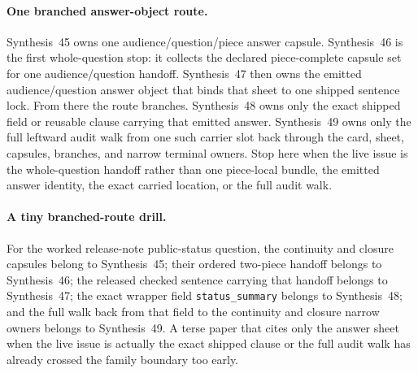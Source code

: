 \documentclass[11pt]{article}
\begin{document}
\paragraph{One branched answer-object route.}
Synthesis~45 owns one audience/question/piece answer capsule. Synthesis~46 is the first whole-question stop: it collects the declared piece-complete capsule set for one audience/question handoff. Synthesis~47 then owns the emitted audience/question answer object that binds that sheet to one shipped sentence lock. From there the route branches. Synthesis~48 owns only the exact shipped field or reusable clause carrying that emitted answer. Synthesis~49 owns only the full leftward audit walk from one such carrier slot back through the card, sheet, capsules, branches, and narrow terminal owners. Stop here when the live issue is the whole-question handoff rather than one piece-local bundle, the emitted answer identity, the exact carried location, or the full audit walk.

\paragraph{A tiny branched-route drill.}
For the worked release-note public-status question, the continuity and closure capsules belong to Synthesis~45; their ordered two-piece handoff belongs to Synthesis~46; the released checked sentence carrying that handoff belongs to Synthesis~47; the exact wrapper field \nolinkurl{status_summary} belongs to Synthesis~48; and the full walk back from that field to the continuity and closure narrow owners belongs to Synthesis~49. A terse paper that cites only the answer sheet when the live issue is actually the exact shipped clause or the full audit walk has already crossed the family boundary too early.
\end{document}
